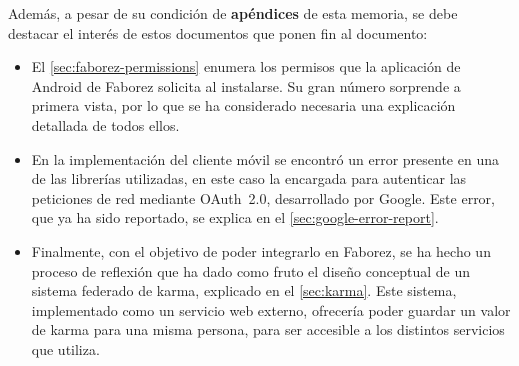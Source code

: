 \documentclass[main]{subfiles}
\begin{document}
Además, a pesar de su condición de \textbf{apéndices} de esta memoria, se debe destacar el interés de estos documentos que ponen fin al documento:

\begin{itemize}
  \item El \cref{sec:faborez-permissions} enumera los permisos que la aplicación de Android de Faborez solicita al instalarse. Su gran número sorprende a primera vista, por lo que se ha considerado necesaria una explicación detallada de todos ellos.
  
  \item En la implementación del cliente móvil se encontró un error presente en una de las librerías utilizadas, en este caso la encargada para autenticar las peticiones de red mediante OAuth~2.0, desarrollado por Google. Este error, que ya ha sido reportado, se explica en el \cref{sec:google-error-report}.
  
  \item Finalmente, con el objetivo de poder integrarlo en Faborez, se ha hecho un proceso de reflexión que ha dado como fruto el diseño conceptual de un sistema federado de karma, explicado en el \cref{sec:karma}. Este sistema, implementado como un servicio web externo, ofrecería poder guardar un valor de karma para una misma persona, para ser accesible a los distintos servicios que utiliza.
\end{itemize}
\end{document}
